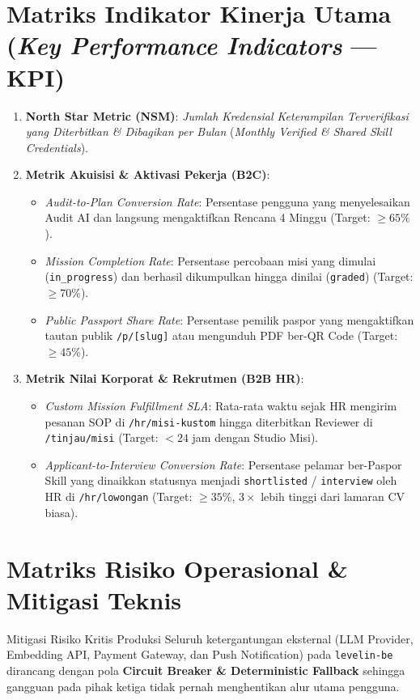 \documentclass[11pt,a4paper]{report}
\begin{document}
\section{Matriks Indikator Kinerja Utama (\textit{Key Performance Indicators} --- KPI)}
\begin{enumerate}[leftmargin=1.5em]
    \item \textbf{North Star Metric (NSM)}: \textit{Jumlah Kredensial Keterampilan Terverifikasi yang Diterbitkan \& Dibagikan per Bulan} (\textit{Monthly Verified \& Shared Skill Credentials}).
    \item \textbf{Metrik Akuisisi \& Aktivasi Pekerja (B2C)}:
    \begin{itemize}
        \item \textit{Audit-to-Plan Conversion Rate}: Persentase pengguna yang menyelesaikan Audit AI dan langsung mengaktifkan Rencana 4 Minggu (Target: $\ge 65\%$).
        \item \textit{Mission Completion Rate}: Persentase percobaan misi yang dimulai (\texttt{in\_progress}) dan berhasil dikumpulkan hingga dinilai (\texttt{graded}) (Target: $\ge 70\%$).
        \item \textit{Public Passport Share Rate}: Persentase pemilik paspor yang mengaktifkan tautan publik \texttt{/p/[slug]} atau mengunduh PDF ber-QR Code (Target: $\ge 45\%$).
    \end{itemize}
    \item \textbf{Metrik Nilai Korporat \& Rekrutmen (B2B HR)}:
    \begin{itemize}
        \item \textit{Custom Mission Fulfillment SLA}: Rata-rata waktu sejak HR mengirim pesanan SOP di \texttt{/hr/misi-kustom} hingga diterbitkan Reviewer di \texttt{/tinjau/misi} (Target: $< 24$ jam dengan Studio Misi).
        \item \textit{Applicant-to-Interview Conversion Rate}: Persentase pelamar ber-Paspor Skill yang dinaikkan statusnya menjadi \texttt{shortlisted} / \texttt{interview} oleh HR di \texttt{/hr/lowongan} (Target: $\ge 35\%$, $3\times$ lebih tinggi dari lamaran CV biasa).
    \end{itemize}
\end{enumerate}

\section{Matriks Risiko Operasional \& Mitigasi Teknis}

\begin{riskbox}{Mitigasi Risiko Kritis Produksi}
Seluruh ketergantungan eksternal (LLM Provider, Embedding API, Payment Gateway, dan Push Notification) pada \texttt{levelin-be} dirancang dengan pola \textbf{Circuit Breaker \& Deterministic Fallback} sehingga gangguan pada pihak ketiga tidak pernah menghentikan alur utama pengguna.
\end{riskbox}
\end{document}
